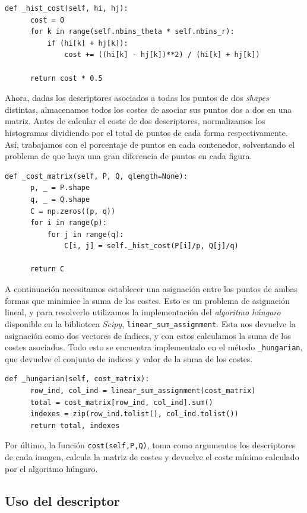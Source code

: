 \documentclass[size=a4, parskip=half, titlepage=false, toc=flat, toc=bib, 12pt]{scrartcl}
\begin{document}
\begin{verbatim}
def _hist_cost(self, hi, hj):
      cost = 0
      for k in range(self.nbins_theta * self.nbins_r):
          if (hi[k] + hj[k]):
              cost += ((hi[k] - hj[k])**2) / (hi[k] + hj[k])

      return cost * 0.5
\end{verbatim}

Ahora, dadas los descriptores asociados a todas los puntos de dos \textit{shapes} distintas, almacenamos todos los costes de asociar sus puntos dos a dos en una matriz. Antes de calcular el coste de dos descriptores, normalizamos los histogramas dividiendo por el total de puntos de cada forma respectivamente. Así, trabajamos con el porcentaje de puntos en cada contenedor, solventando el problema de que haya una gran diferencia de puntos en cada figura.

\begin{verbatim}
def _cost_matrix(self, P, Q, qlength=None):
      p, _ = P.shape
      q, _ = Q.shape
      C = np.zeros((p, q))
      for i in range(p):
          for j in range(q):
              C[i, j] = self._hist_cost(P[i]/p, Q[j]/q)

      return C
\end{verbatim}

A continuación necesitamos establecer una asignación entre los puntos de ambas formas que minimice la suma de los costes. Esto es un problema de asignación lineal, y para resolverlo utilizamos la implementación del \textit{algoritmo húngaro} disponible en la biblioteca \textit{Scipy}, \texttt{linear\_sum\_assignment}. Esta nos devuelve la asignación como dos vectores de índices, y con estos calculamos la suma de los costes asociados. Todo esto se encuentra implementado en el método \texttt{\_hungarian}, que devuelve el conjunto de indices y valor de la suma de los costes.

\begin{verbatim}
def _hungarian(self, cost_matrix):
      row_ind, col_ind = linear_sum_assignment(cost_matrix)
      total = cost_matrix[row_ind, col_ind].sum()
      indexes = zip(row_ind.tolist(), col_ind.tolist())
      return total, indexes
\end{verbatim}

Por último, la función \texttt{cost(self,P,Q)}, toma como argumentos los descriptores de cada imagen, calcula la matriz de costes y devuelve el coste mínimo calculado por el algoritmo húngaro.

\subsection{Uso del descriptor}%
\label{sub:uso_del_descriptor}
\end{document}
